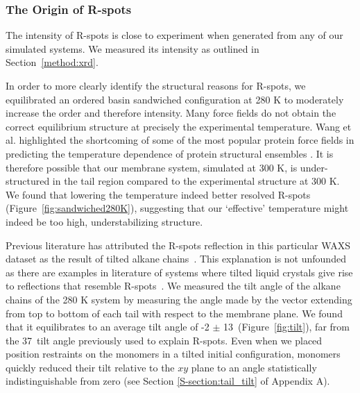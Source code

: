   \subsubsection{The Origin of R-spots}\label{section:rspots}
  
  The intensity of R-spots is close to experiment when generated from any of
  our simulated systems. We measured its intensity as outlined in Section~\ref{method:xrd}.

  In order to more clearly identify the structural reasons for R-spots, we
  equilibrated an ordered basin sandwiched configuration at 280 K to moderately
  increase the order and therefore intensity. Many force fields do not obtain
  the correct equilibrium structure at precisely the experimental temperature.
  Wang et al. highlighted the shortcoming of some of the most popular protein
  force fields in predicting the temperature dependence of protein structural
  ensembles \cite{wang_building_2017}. It is therefore possible that   %
  our membrane system, simulated at 300 K, is under-structured in the tail region
  compared to the experimental structure at 300 K. We found that lowering the
  temperature indeed better resolved R-spots (Figure~\ref{fig:sandwiched280K}),
  suggesting that our `effective' temperature might indeed be too high,
  understabilizing structure. 

  \label{addition:rspots}
  Previous literature has attributed the R-spots reflection in this particular
  WAXS dataset as the result of tilted alkane chains~\cite{feng_scalable_2014}.
  This explanation is not unfounded as there are examples in literature of
  systems where tilted liquid crystals give rise to reflections that resemble
  R-spots~\cite{percec_self-assembly_2009,gearba_homeotropic_2007}. We 
  measured the tilt angle of the alkane chains of the 280 K system by measuring
  the angle made by the vector extending from top to
  bottom of each tail with respect to the membrane plane. We found that it
  equilibrates to an average tilt angle of -2 $\pm$
  13\degree~(Figure~\ref{fig:tilt}), far from the 37\degree~tilt angle previously
  used to explain R-spots. Even when we placed position restraints on the
  monomers in a tilted initial configuration, monomers quickly reduced their tilt
  relative to the $xy$ plane to an angle statistically indistinguishable from zero
  (see Section \ref{S-section:tail_tilt} of Appendix A). 
  

